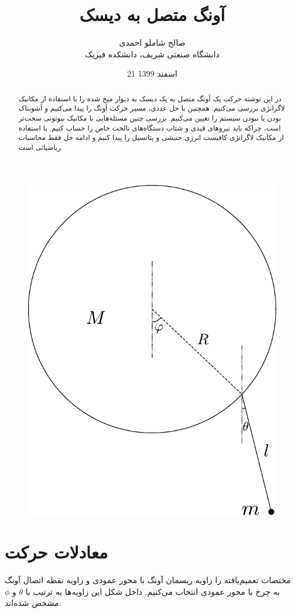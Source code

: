 \documentclass[12pt,a4paper]{article}
\title{آونگ متصل به دیسک}
\author{صالح شاملو احمدی\\دانشگاه صنعتی شریف، دانشکده فیزیک}
\date{21 اسفند 1399}
\begin{document}
	\maketitle
	\begin{figure}
		\centering
		\includegraphics[width=\linewidth]{../figures/fig}
	\end{figure}
	\begin{abstract}
		در این نوشته حرکت یک آونگ متصل به یک دیسک به دیوار میخ شده را با استفاده از مکانیک لاگرانژی بررسی می‌کنیم.
		همچنین با حل عددی، مسیر حرکت آونگ را پیدا می‌کنیم و آشوبناک بودن یا نبودن سیستم را تعیین می‌کنیم.
		بررسی چنین مسئله‌هایی با مکانیک نیوتونی سخت‌تر است، چراکه باید نیرو‌های قیدی و شتاب دستگاه‌های نالخت خاص را حساب کنیم.
		با استفاده از مکانیک لاگرانژی کافیست انرژی جنبشی و پتانسیل را پیدا کنیم و ادامه حل فقط محاسبات ریاضیاتی است.
	\end{abstract}
	\section{معادلات حرکت}
	مختصات تعمیم‌یافته را زاویه ریسمان آونگ با محور عمودی و زاویه نقطه اتصال آونگ به چرخ با محور عمودی انتخاب می‌کنیم. داخل شکل این زاویه‌ها به ترتیب با $\theta$ و $\phi$ مشخص شده‌اند.
	
\end{document}
